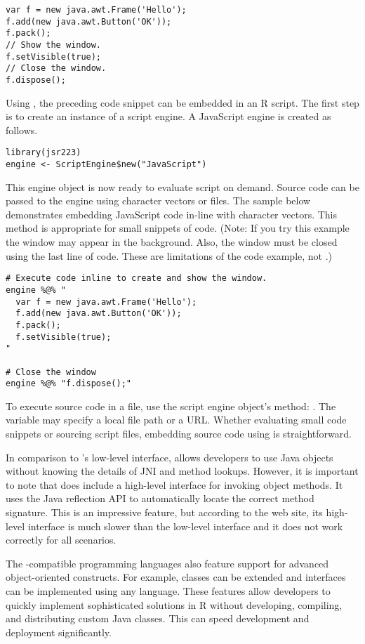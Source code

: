 \begin{verbatim}
var f = new java.awt.Frame('Hello');
f.add(new java.awt.Button('OK'));
f.pack();
// Show the window.
f.setVisible(true);
// Close the window.
f.dispose();
\end{verbatim}

Using , the preceding code snippet can be embedded in an R script. The first step is to create an instance of a script engine. A JavaScript engine is created as follows.

\begin{verbatim}
library(jsr223)
engine <- ScriptEngine$new("JavaScript")
\end{verbatim}
This engine object is now ready to evaluate script on demand. Source code can be passed to the engine using character vectors or files. The sample below demonstrates embedding JavaScript code in-line with character vectors. This method is appropriate for small snippets of code. (Note: If you try this example the window may appear in the background. Also, the window must be closed using the last line of code. These are limitations of the code example, not .)

\begin{verbatim}
# Execute code inline to create and show the window.
engine %@% "
  var f = new java.awt.Frame('Hello');
  f.add(new java.awt.Button('OK'));
  f.pack();
  f.setVisible(true);
"

# Close the window
engine %@% "f.dispose();"
\end{verbatim}
To execute source code in a file, use the script engine object's  method:
\newline {}. The variable  may specify a local file path or a URL. Whether evaluating small code snippets or sourcing script files, embedding source code using  is straightforward.

In comparison to 's low-level interface,  allows developers to use Java objects without knowing the details of JNI and method lookups. However, it is important to note that  does include a high-level interface for invoking object methods. It uses the Java reflection API to automatically locate the correct method signature. This is an impressive feature, but according to the  web site, its high-level interface is much slower than the low-level interface and it does not work correctly for all scenarios.

The -compatible programming languages also feature support for advanced object-oriented constructs. For example, classes can be extended and interfaces can be implemented using any language. These features allow developers to quickly implement sophisticated solutions in R without developing, compiling, and distributing custom Java classes. This can speed development and deployment significantly.

